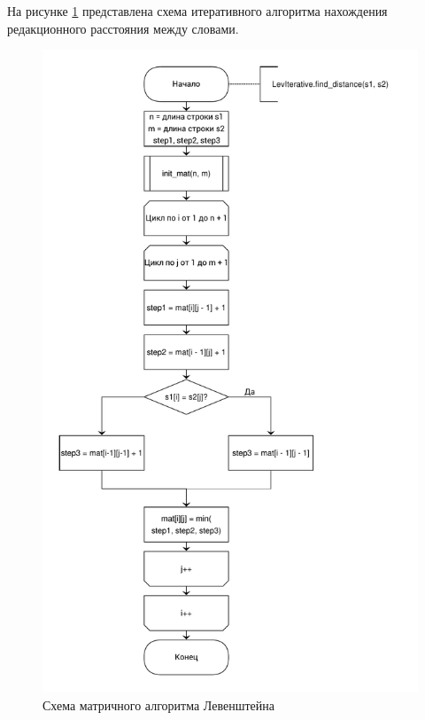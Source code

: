 \documentclass[a4paper,oneside,14pt]{extreport}
\begin{document}
На рисунке \ref{fig:iter_lev} представлена схема итеративного алгоритма нахождения редакционного расстояния между словами.
\begin{figure}[H]
	\centering
	\includegraphics[width=0.83\linewidth, height=1.3\linewidth]{images/iteratLevenshtain}
	\caption{Схема матричного алгоритма Левенштейна}
	\label{fig:iter_lev}
\end{figure}
\end{document}
